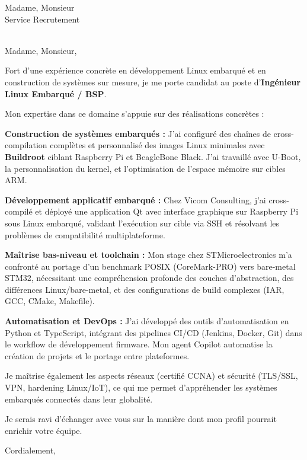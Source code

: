 \documentclass[11pt,a4paper]{letter}
\begin{document}
\begin{letter}{Madame, Monsieur \\ Service Recrutement \\ [Nom de l'entreprise] \\ [Adresse]}

\opening{Madame, Monsieur,}

Fort d'une exp\'erience concr\`ete en d\'eveloppement Linux embarqu\'e et en construction de syst\`emes sur mesure, je me porte candidat au poste d'\textbf{Ing\'enieur Linux Embarqu\'e / BSP}.

Mon expertise dans ce domaine s'appuie sur des r\'ealisations concr\`etes :

\textbf{Construction de syst\`emes embarqu\'es :} J'ai configur\'e des cha\^ines de cross-compilation compl\`etes et personnalis\'e des images Linux minimales avec \textbf{Buildroot} ciblant Raspberry Pi et BeagleBone Black. J'ai travaill\'e avec U-Boot, la personnalisation du kernel, et l'optimisation de l'espace m\'emoire sur cibles ARM.

\textbf{D\'eveloppement applicatif embarqu\'e :} Chez Vicom Consulting, j'ai cross-compil\'e et d\'eploy\'e une application Qt avec interface graphique sur Raspberry Pi sous Linux embarqu\'e, validant l'ex\'ecution sur cible via SSH et r\'esolvant les probl\`emes de compatibilit\'e multiplateforme.

\textbf{Ma\^itrise bas-niveau et toolchain :} Mon stage chez STMicroelectronics m'a confront\'e au portage d'un benchmark POSIX (CoreMark-PRO) vers bare-metal STM32, n\'ecessitant une compr\'ehension profonde des couches d'abstraction, des diff\'erences Linux/bare-metal, et des configurations de build complexes (IAR, GCC, CMake, Makefile).

\textbf{Automatisation et DevOps :} J'ai d\'evelopp\'e des outils d'automatisation en Python et TypeScript, int\'egrant des pipelines CI/CD (Jenkins, Docker, Git) dans le workflow de d\'eveloppement firmware. Mon agent Copilot automatise la cr\'eation de projets et le portage entre plateformes.

Je ma\^itrise \'egalement les aspects r\'eseaux (certifi\'e CCNA) et s\'ecurit\'e (TLS/SSL, VPN, hardening Linux/IoT), ce qui me permet d'appr\'ehender les syst\`emes embarqu\'es connect\'es dans leur globalit\'e.

Je serais ravi d'\'echanger avec vous sur la mani\`ere dont mon profil pourrait enrichir votre \'equipe.

\closing{Cordialement,}

\end{letter}
\end{document}
